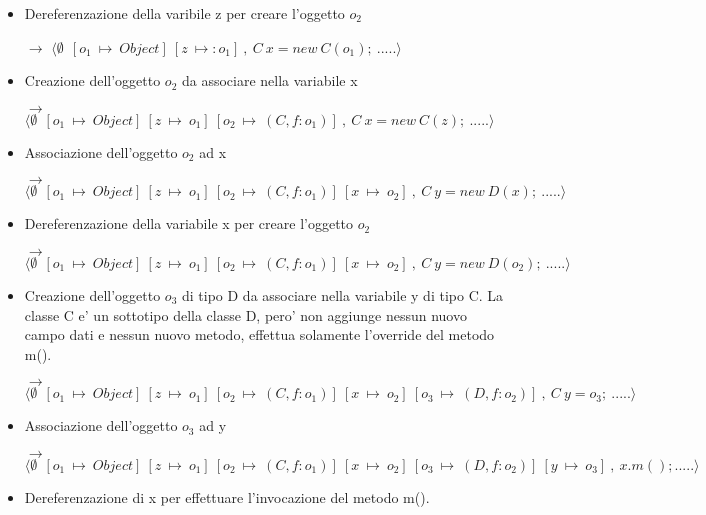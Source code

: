 \begin{itemize}
\vspace{0,5cm}
\item Dereferenzazione della varibile z per creare l'oggetto $o_2$

$\rightarrow$ $\langle\emptyset\:\:[o_1\:\mapsto\:Object]\:[z\:\mapsto:o_1]\:,\:C\:x=new\:C(o_1);\:.....\rangle$

\vspace{0,5cm}
\item Creazione dell'oggetto $o_2$ da associare nella variabile x

$\rightarrow$ $\langle\emptyset\:\:[o_1\:\mapsto\:Object]\:[z\:\mapsto\:o_1]\:[o_2\:\mapsto\:(C,f:o_1)]\:,\:C\:x=new\:C(z);\:.....\rangle$

\vspace{0,5cm}
\item Associazione dell'oggetto $o_2$ ad x

$\rightarrow$ $\langle\emptyset\:\:[o_1\:\mapsto\:Object]\:[z\:\mapsto\:o_1]\:[o_2\:\mapsto\:(C,f:o_1)]\:[x\:\mapsto\:o_2]\:,\:C\:y=new\:D(x);\:.....\rangle$

\vspace{0,5cm}
\item Dereferenzazione della variabile x per creare l'oggetto $o_2$

$\rightarrow$ $\langle\emptyset\:\:[o_1\:\mapsto\:Object]\:[z\:\mapsto\:o_1]\:[o_2\:\mapsto\:(C,f:o_1)]\:[x\:\mapsto\:o_2]\:,\:C\:y=new\:D(o_2);\:.....\rangle$

\vspace{0,5cm}
\item Creazione dell'oggetto $o_3$ di tipo D da associare nella variabile y di tipo C. La classe C e' un sottotipo della classe D, pero' non aggiunge nessun nuovo campo dati e nessun nuovo metodo, effettua solamente l'override del metodo m().

$\rightarrow$ $\langle\emptyset\:\:[o_1\:\mapsto\:Object]\:[z\:\mapsto\:o_1]\:[o_2\:\mapsto\:(C,f:o_1)]\:[x\:\mapsto\:o_2]\:[o_3\:\mapsto\:(D,f:o_2)]\:,\:C\:y=o_3;\:.....\rangle$

\vspace{0,5cm}
\item Associazione dell'oggetto $o_3$ ad y

$\rightarrow$ $\langle\emptyset\:\:[o_1\:\mapsto\:Object]\:[z\:\mapsto\:o_1]\:[o_2\:\mapsto\:(C,f:o_1)]\:[x\:\mapsto\:o_2]\:[o_3\:\mapsto\:(D,f:o_2)]\:[y\:\mapsto\:o_3]\:,\:x.m();.....\rangle$

\vspace{0,5cm}
\item Dereferenzazione di x per effettuare l'invocazione del metodo m().


\end{itemize}
